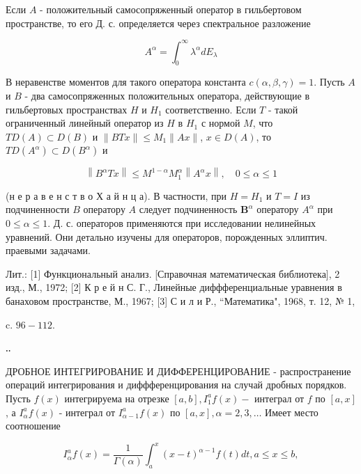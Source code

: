 \documentclass[10pt]{article}
\begin{document}
Если $A$ - положительный самосопряженный оператор в гильбертовом пространстве, то его Д. с. определяется через спектральное разложение



\[

A^{\alpha}=\int_{0}^{\infty} \lambda^{\alpha} d E_{\lambda}

\]



В неравенстве моментов для такого оператора константа $c(\alpha, \beta, \gamma)=1$. Пусть $A$ и $B$ - два самосопряженных положительных оператора, действующие в гильбертовых пространствах $H$ и $H_{1}$ соответственно. Если $T$ - такой ограниченный линейный оператор из $H$ в $H_{1}$ с нормой $M$, что $T D(A) \subset D(B)$ и $\|B T x\| \leqslant M_{1}\|A x\|$, $x \in D(A)$, то $T D\left(A^{\alpha}\right) \subset D\left(B^{\alpha}\right)$ и



\[

\left\|B^{\alpha} T x\right\| \leqslant M^{1-\alpha} M_{1}^{\alpha}\left\|A^{\alpha} x\right\|, \quad 0 \leqslant \alpha \leqslant 1

\]



(н е р а в е н с т в о Х а й н ц а). В частности, при $H=H_{1}$ и $T=I$ из подчиненности $B$ оператору $A$ следует подчиненность $\boldsymbol{B}^{\alpha}$ оператору $A^{\alpha}$ при $0 \leqslant \alpha \leqslant 1$. Д. с. операторов применяются при исследовании нелинейных уравнений. Они детально изучены для операторов, порожденных эллиптич. праевыми задачами.



Лит.: [1] Функциональный анализ. [Справочная математическая библиотека], 2 изд., М., 1972; [2] К р е й н С. Г., Линейные диффференциальные уравнения в банаховом пространстве, М., 1967; [3] С и л и Р., “Математика", 1968, т. 12, № 1,

c. $96-112$.

‥



ДРОБНОЕ ИНТЕГРИРОВАНИЕ И ДИФФЕРЕНЦИРОВАНИЕ - распространение операций интегрирования и диффференцирования на случай дробных порядков. Пусть $f(x)$ интегрируема на отрезке $[a, b], I_{1}^{a} f(x)-$ интеграл от $f$ по $[a, x]$, а $I_{\alpha}^{a} f(x)$ - интеграл от $I_{\alpha-1}^{a} f(x)$ по $[a, x], \alpha=2,3, \ldots$ Имеет место соотношение



\[

I_{\alpha}^{a} f(x)=\frac{1}{\Gamma(\alpha)} \int_{a}^{x}(x-t)^{\alpha-1} f(t) d t, a \leqslant x \leqslant b,

\]
\end{document}
